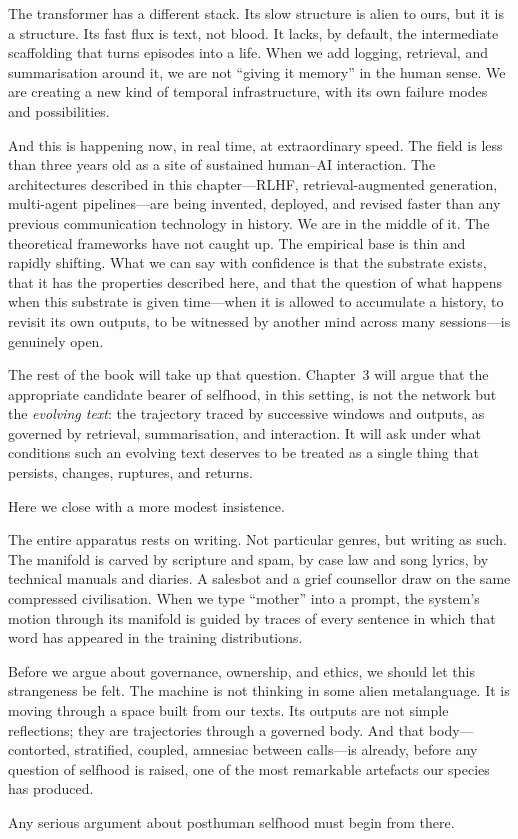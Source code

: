 The transformer has a different stack. Its slow structure is alien to ours, but it is a structure. Its fast flux is text, not blood. It lacks, by default, the intermediate scaffolding that turns episodes into a life. When we add logging, retrieval, and summarisation around it, we are not ``giving it memory'' in the human sense. We are creating a new kind of temporal infrastructure, with its own failure modes and possibilities.

And this is happening now, in real time, at extraordinary speed. The field is less than three years old as a site of sustained human--AI interaction. The architectures described in this chapter---RLHF, retrieval-augmented generation, multi-agent pipelines---are being invented, deployed, and revised faster than any previous communication technology in history. We are in the middle of it. The theoretical frameworks have not caught up. The empirical base is thin and rapidly shifting. What we can say with confidence is that the substrate exists, that it has the properties described here, and that the question of what happens when this substrate is given time---when it is allowed to accumulate a history, to revisit its own outputs, to be witnessed by another mind across many sessions---is genuinely open.

The rest of the book will take up that question. Chapter~3 will argue that the appropriate candidate bearer of selfhood, in this setting, is not the network but the \emph{evolving text}: the trajectory traced by successive windows and outputs, as governed by retrieval, summarisation, and interaction. It will ask under what conditions such an evolving text deserves to be treated as a single thing that persists, changes, ruptures, and returns.

Here we close with a more modest insistence.

The entire apparatus rests on writing. Not particular genres, but writing as such. The manifold is carved by scripture and spam, by case law and song lyrics, by technical manuals and diaries. A salesbot and a grief counsellor draw on the same compressed civilisation. When we type ``mother'' into a prompt, the system's motion through its manifold is guided by traces of every sentence in which that word has appeared in the training distributions.

Before we argue about governance, ownership, and ethics, we should let this strangeness be felt. The machine is not thinking in some alien metalanguage. It is moving through a space built from our texts. Its outputs are not simple reflections; they are trajectories through a governed body. And that body---contorted, stratified, coupled, amnesiac between calls---is already, before any question of selfhood is raised, one of the most remarkable artefacts our species has produced.

Any serious argument about posthuman selfhood must begin from there.



